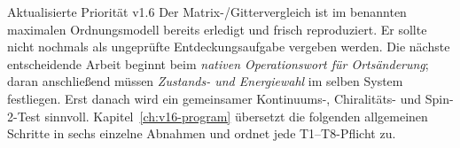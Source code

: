 \begin{bild}{Aktualisierte Priorität v1.6}
Der Matrix-/Gittervergleich ist im benannten maximalen Ordnungsmodell bereits erledigt und frisch reproduziert. Er sollte nicht nochmals als ungeprüfte Entdeckungsaufgabe vergeben werden. Die nächste entscheidende Arbeit beginnt beim \emph{nativen Operationswort für Ortsänderung}; daran anschließend müssen \emph{Zustands- und Energiewahl} im selben System festliegen. Erst danach wird ein gemeinsamer Kontinuums-, Chiralitäts- und Spin-2-Test sinnvoll. Kapitel~\ref{ch:v16-program} übersetzt die folgenden allgemeinen Schritte in sechs einzelne Abnahmen und ordnet jede T1--T8-Pflicht zu.
\end{bild}
